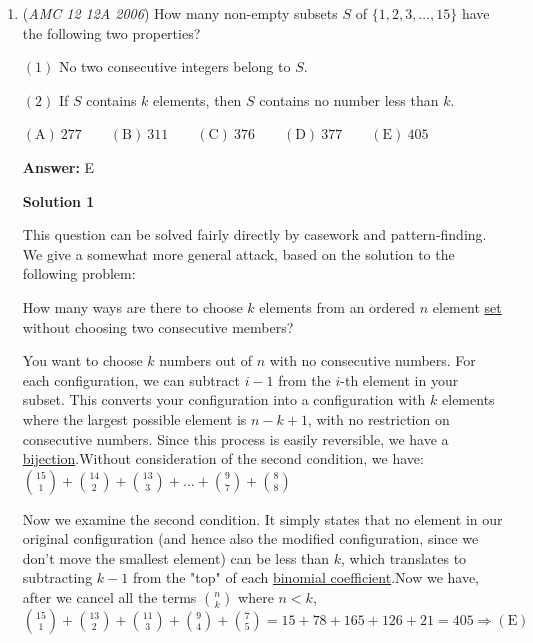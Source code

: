\begin{enumerate}
\textbf{Solution 7(Casu Martzu)}

As in Solution 1, note that if we assume no terms are cancelled, by stars and bars there will be $\dbinom{2006+2}{3}=2015028.$ Now, to get a lower bound, note that at most half of the terms will get their sign changed, as there is about a 50-50 chance that we will get an odd number of $-y$ and $-z$ terms. This eliminates options $A,B,E.$ Finally, since there are terms where we have an odd number of both $y$ and $z$ terms, the chances are slightly higher than 50-50, leaving us with $D$ as our only option.

 


	\item (\textit{AMC 12 12A 2006}) How many non-empty subsets $S$ of $\lbrace 1,2,3,\ldots ,15\rbrace$ have the following two properties? 


 $(1)$  No two consecutive integers belong to $S$.


 $(2)$  If $S$ contains $k$ elements, then $S$ contains no number less than $k$.


 $\mathrm{(A) \ } 277\qquad \mathrm{(B) \ } 311\qquad \mathrm{(C) \ } 376\qquad \mathrm{(D) \ } 377\qquad \mathrm{(E) \ }  405$

 \textbf{Answer: }E



\textbf{Solution 1}

This question can be solved fairly directly by casework and pattern-finding.  We give a somewhat more general attack, based on the solution to the following problem:

 How many ways are there to choose $k$ elements from an ordered $n$ element \href{https://artofproblemsolving.com/wiki/index.php?title=Set}{set} without choosing two consecutive members?

 You want to choose $k$ numbers out of $n$ with no consecutive numbers. For each configuration, we can subtract $i-1$ from the $i$-th element in your subset. This converts your configuration into a configuration with $k$ elements where the largest possible element is $n-k+1$, with no restriction on consecutive numbers. Since this process is easily reversible, we have a \href{https://artofproblemsolving.com/wiki/index.php?title=Bijection}{bijection}.Without consideration of the second condition, we have:${15 \choose 1} + {14 \choose 2} + {13 \choose 3} + ... + {9 \choose 7} + {8 \choose 8}$

 Now we examine the second condition. It simply states that no element in our original configuration (and hence also the modified configuration, since we don't move the smallest element) can be less than $k$, which translates to subtracting $k - 1$ from the "top" of each \href{https://artofproblemsolving.com/wiki/index.php?title=Binomial\_coefficient}{binomial coefficient}.Now we have, after we cancel all the terms ${n \choose k}$ where $n < k$, ${15 \choose 1} + {13 \choose 2} + {11 \choose 3} + {9 \choose 4} + {7 \choose 5}=  15 + 78 + 165 + 126 + 21 = \boxed{405} \Longrightarrow \mathrm{(E)}$





\end{enumerate}
